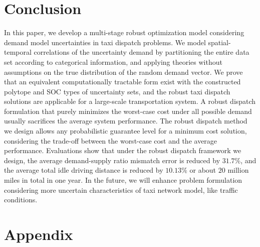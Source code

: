 \documentclass[10pt,twocolumn,twoside,english]{IEEEtran}
\begin{document}
\section{Conclusion}
\label{sec:conclusion}
In this paper, we develop a multi-stage robust optimization model considering demand model uncertainties in taxi dispatch problems. We model spatial-temporal correlations of the uncertainty demand by partitioning the entire data set according to categorical information, and applying theories without assumptions on the true distribution of the random demand vector. We prove that an equivalent computationally tractable form exist with the constructed polytope and SOC types of uncertainty sets, and the robust taxi dispatch solutions are applicable for a large-scale transportation system. A robust dispatch formulation that purely minimizes the worst-case cost under all possible demand usually sacrifices the average system performance. The robust dispatch method we design allows any probabilistic guarantee level for a minimum cost solution, considering the trade-off between the worst-case cost and the average performance. Evaluations show that under the robust dispatch framework we design, the average demand-supply ratio mismatch error is reduced by $31.7\%$, and the average total idle driving distance is reduced by $10.13\%$ or about $20$ million miles in total in one year. In the future, we will enhance problem formulation considering more uncertain characteristics of taxi network model, like traffic conditions. 


{  \small 

}
\section{Appendix}
\label{appendix}
\end{document}
